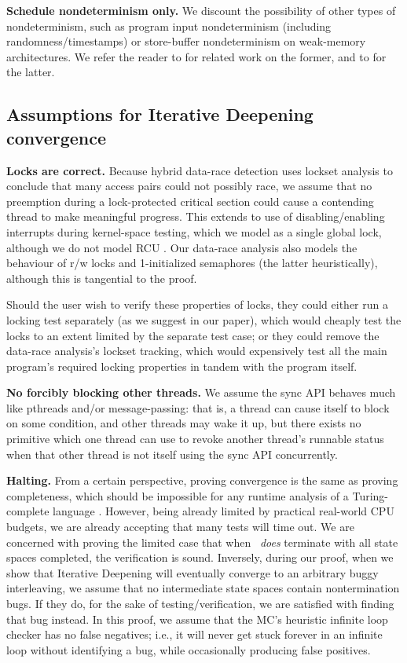 {\bf Schedule nondeterminism only.}
We discount the possibility of other types of nondeterminism,
such as program input nondeterminism (including randomness/timestamps) or
store-buffer nondeterminism on weak-memory architectures.
We refer the reader to \cite{klee,portend} for related work on the former, and to \cite{tsopso} for the latter.

\subsection{Assumptions for Iterative Deepening convergence}

{\bf Locks are correct.}
Because hybrid data-race detection uses lockset analysis to conclude that many access pairs could not possibly race,
we assume that no preemption during a lock-protected critical section could cause a contending thread to make meaningful progress.
This extends to use of disabling/enabling interrupts during kernel-space testing, which we model as a single global lock,
although we do not model RCU \cite{rcu}.
Our data-race analysis also models the behaviour of r/w locks and 1-initialized semaphores (the latter heuristically), although this is tangential to the proof.

Should the user wish to verify these properties of locks,
they could either run a locking test separately (as we suggest in our paper),
which would cheaply test the locks to an extent limited by the separate test case;
or they could remove the data-race analysis's lockset tracking,
which would expensively test all the main program's required locking properties in tandem with the program itself.

{\bf No forcibly blocking other threads.}
We assume the sync API behaves much like pthreads and/or message-passing:
that is, a thread can cause itself to block on some condition,
and other threads may wake it up,
but there exists no primitive which one thread can use to revoke another thread's runnable status when that other thread is not itself using the sync API concurrently.

{\bf Halting.}
From a certain perspective, proving convergence is the same as proving completeness,
which should be impossible for any runtime analysis of a Turing-complete language \cite{entscheidungsproblem}.
However, being already limited by practical real-world CPU budgets,
we are already accepting that many tests will time out.
We are concerned with proving the limited case that when \quicksand~{\em does} terminate with all state spaces completed, the verification is sound.
Inversely, during our proof, when we show that Iterative Deepening will eventually converge to an arbitrary buggy interleaving, we assume that no intermediate state spaces contain nontermination bugs.
If they do, for the sake of testing/verification, we are satisfied with finding that bug instead.
In this proof, we assume that the MC's heuristic infinite loop checker has no false negatives;
i.e., it will never get stuck forever in an infinite loop without identifying a bug, while occasionally producing false positives.


